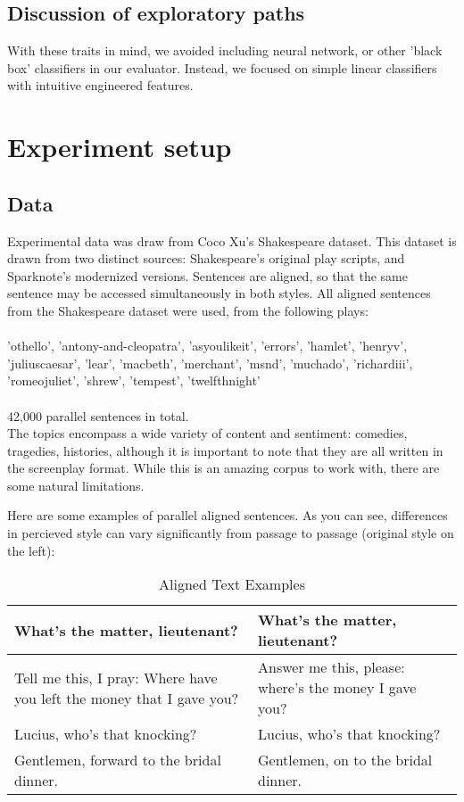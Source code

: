 \documentclass[letterpaper, 10 pt, conference]{ieeeconf}  %
\begin{document}
  \subsection{Discussion of exploratory paths} 
  With these traits in mind, we avoided including neural network, or other 'black box' classifiers in our evaluator. Instead, we focused on simple linear classifiers with intuitive engineered features. 


\section{Experiment setup}
  
  \subsection{Data}
  Experimental data was draw from Coco Xu's Shakespeare dataset. This dataset is drawn from two distinct sources: Shakespeare's original play scripts, and Sparknote's modernized versions. Sentences are aligned, so that the same sentence may be accessed simultaneously in both styles.
  All aligned sentences from the Shakespeare dataset were used, from the following plays:\\ \\ 'othello', 'antony-and-cleopatra', 'asyoulikeit', 
                       'errors', 'hamlet', 'henryv', 'juliuscaesar', 'lear', 'macbeth', 
                       'merchant', 'msnd', 'muchado', 'richardiii', 'romeojuliet', 
                       'shrew', 'tempest', 'twelfthnight'
\\ \\
  42,000 parallel sentences in total.
\\
  The topics encompass a wide variety of content and sentiment: comedies, tragedies, histories, although it is important to note that they are all written in the screenplay format. While this is an amazing corpus to work with, there are some natural limitations.

  Here are some examples of parallel aligned sentences. As you can see, differences in percieved style can vary significantly from passage to passage (original style on the left):


  \begin{table}[h]
    \caption{Aligned Text Examples}
    \label{table_example}
    \begin{center}
      \begin{tabular}{| p{3.5cm}  | p{3.5cm} |}
      \hline
      What's the matter, lieutenant? & What's the matter, lieutenant?\\
      \hline
      Tell me this, I pray: Where have you left the money that I gave you? & Answer me this, please: where's the money I gave you?\\
      \hline
      Lucius, who's that knocking? & Lucius, who's that knocking?\\
      \hline
      Gentlemen, forward to the bridal dinner. & Gentlemen, on to the bridal dinner.\\
      \hline
      \end{tabular}
    \end{center}
  \end{table}
\end{document}
